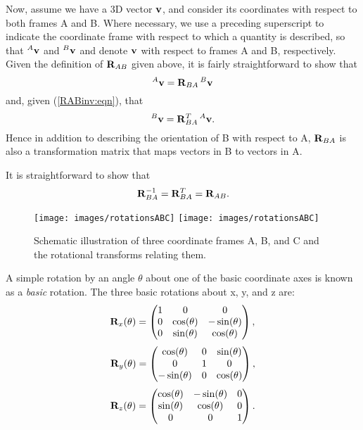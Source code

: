 Now, assume we have a 3D vector ${\bf v}$, and consider its coordinates
with respect to both frames A and B.  Where necessary, we use a
preceding superscript to indicate the coordinate frame with respect to
which a quantity is described, so that ${}^A{\bf v}$ and ${}^B{\bf v}$ and
denote ${\bf v}$ with respect to frames A and B, respectively.  Given the
definition of ${\bf R}_{AB}$ given above, it is fairly straightforward to
show that
%
\begin{equation}
{}^A{\bf v} = {\bf R}_{BA} \, {}^B{\bf v}
\label{vectorTransform:eqn}
\end{equation}
%
and, given (\ref{RABinv:eqn}), that
%
\begin{equation}
{}^B{\bf v} = {\bf R}_{BA}^T \, {}^A{\bf v}.
\label{vectorInvTransform:eqn}
\end{equation}
%
Hence in addition to describing the orientation of B with respect to A,
${\bf R}_{BA}$ is also a transformation matrix that maps vectors in B
to vectors in A.

It is straightforward to show that
%
\begin{equation}
{\bf R}_{BA}^{-1} = {\bf R}_{BA}^T = {\bf R}_{AB}.
\label{rotationInverse:eqn}
\end{equation}
%

\begin{figure}[t]
\begin{center}
 \iflatexml
   \texttt{[image: images/rotationsABC]}
 \else
   \texttt{[image: images/rotationsABC]}
 \fi
\end{center}
\caption{Schematic illustration of three coordinate frames A, B, and C
and the rotational transforms relating them.}
\label{rotationsABC:fig}
\end{figure}

A simple rotation by an angle $\theta$ about one of the basic
coordinate axes is known as a {\it basic} rotation. The three
basic rotations about x, y, and z are:
%
\begin{equation*}
{\bf R}_x(\theta) = \left(\begin{matrix} 1 & 0 & 0 \\ 
               0 & \cos(\theta) & -\sin(\theta) \\ 
               0 & \sin(\theta) & \cos(\theta) 
		 \end{matrix}\right),
\end{equation*}
%
\begin{equation*}
{\bf R}_y(\theta) = \left(\begin{matrix} \cos(\theta) & 0 & \sin(\theta) \\ 
               0 & 1 & 0 \\ 
               -\sin(\theta) & 0 & \cos(\theta) 
                 \end{matrix}\right),
\end{equation*}
%
\begin{equation*}
{\bf R}_z(\theta) = \left(\begin{matrix} \cos(\theta) & -\sin(\theta) & 0 \\ 
               \sin(\theta) & \cos(\theta) & 0 \\ 
               0 & 0 & 1 
                 \end{matrix}\right).
\label{elementaryRotations:sec}
\end{equation*}
%

